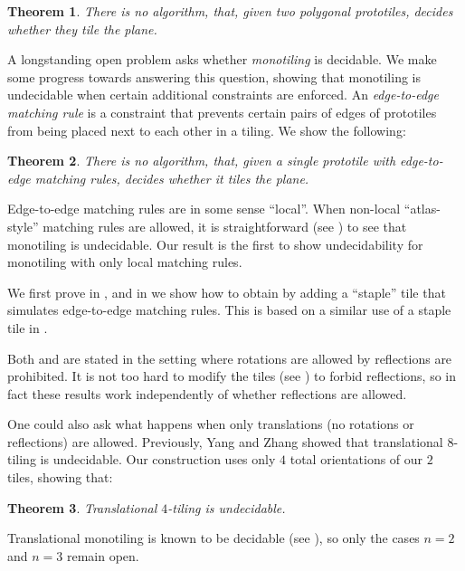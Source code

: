 \documentclass[11pt]{article}
\theoremstyle{plain}
\newtheorem{theorem}{Theorem}
\theoremstyle{definition}
\begin{document}
\begin{theorem}\label{thm:main}
There is no algorithm, that, given two polygonal prototiles, decides whether they tile the plane. 
\end{theorem}

A longstanding open problem \cite{GoodmanStraussSurvey} asks whether \emph{monotiling} is decidable. We make some progress towards answering this question, showing that monotiling is undecidable when certain additional constraints are enforced. An \emph{edge-to-edge matching rule} is a constraint that prevents certain pairs of edges of prototiles from being placed next to each other in a tiling. We show the following:

\begin{theorem}\label{thm:onetiling}
There is no algorithm, that, given a single prototile with edge-to-edge matching rules, decides whether it tiles the plane.
\end{theorem}

Edge-to-edge matching rules are in some sense ``local''. When non-local ``atlas-style'' matching rules are allowed, it is straightforward (see \cite{GoodmanStraussSurvey}) to see that monotiling is undecidable. Our result is the first to show undecidability for monotiling with only local matching rules.

We first prove  in , and in  we show how to obtain  by adding a ``staple'' tile that simulates edge-to-edge matching rules. This is based on a similar use of a staple tile in \cite{DemaineLangerman3Tiling}.

Both  and  are stated in the setting where rotations are allowed by reflections are prohibited. It is not too hard to modify the tiles (see ) to forbid reflections, so in fact these results work independently of whether reflections are allowed.

One could also ask what happens when only translations (no rotations or reflections) are allowed. Previously, Yang and Zhang \cite{YangZhang8Tiling} showed that translational $8$-tiling is undecidable. Our construction uses only $4$ total orientations of our $2$ tiles, showing that:

\begin{theorem}\label{thm:translationaltiling}
Translational $4$-tiling is undecidable. 
\end{theorem}

Translational monotiling is known to be decidable (see \cite{GBNTranslationalMonotiling}), so only the cases $n=2$ and $n=3$ remain open.
\end{document}
